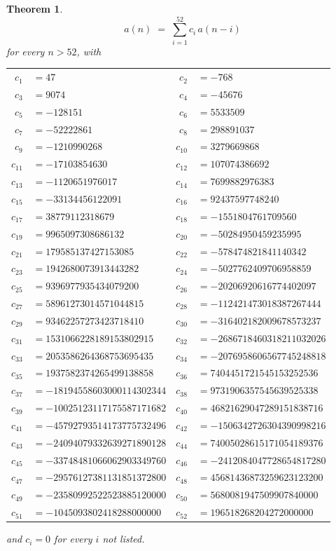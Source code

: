 \documentclass[11pt,a4paper]{article}
\theoremstyle{plain}
\newtheorem{theorem}{Theorem}
\theoremstyle{definition}
\begin{document}
\begin{theorem}
\[
a(n)\;=\;\sum_{i=1}^{52}c_i\,a(n-i)
\]
for every $n>52$, with
\begin{center}\footnotesize
\begin{tabular}{r@{\,}l@{\qquad}r@{\,}l}
$c_{1}$ & $=47$ & $c_{2}$ & $=-768$ \\
$c_{3}$ & $=9074$ & $c_{4}$ & $=-45676$ \\
$c_{5}$ & $=-128151$ & $c_{6}$ & $=5533509$ \\
$c_{7}$ & $=-52222861$ & $c_{8}$ & $=298891037$ \\
$c_{9}$ & $=-1210990268$ & $c_{10}$ & $=3279669868$ \\
$c_{11}$ & $=-17103854630$ & $c_{12}$ & $=107074386692$ \\
$c_{13}$ & $=-1120651976017$ & $c_{14}$ & $=7699882976383$ \\
$c_{15}$ & $=-33134456122091$ & $c_{16}$ & $=92437597748240$ \\
$c_{17}$ & $=38779112318679$ & $c_{18}$ & $=-1551804761709560$ \\
$c_{19}$ & $=9965097308686132$ & $c_{20}$ & $=-50284950459235995$ \\
$c_{21}$ & $=179585137427153085$ & $c_{22}$ & $=-578474821841140342$ \\
$c_{23}$ & $=1942680073913443282$ & $c_{24}$ & $=-5027762409706958859$ \\
$c_{25}$ & $=9396977935434079200$ & $c_{26}$ & $=-20206920616774402097$ \\
$c_{27}$ & $=58961273014571044815$ & $c_{28}$ & $=-112421473018387267444$ \\
$c_{29}$ & $=93462257273423718410$ & $c_{30}$ & $=-316402182009678573237$ \\
$c_{31}$ & $=1531066228189153802915$ & $c_{32}$ & $=-2686718460318211032026$ \\
$c_{33}$ & $=2053586264368753695435$ & $c_{34}$ & $=-2076958606567745248818$ \\
$c_{35}$ & $=1937582374265499138858$ & $c_{36}$ & $=7404451721545153252536$ \\
$c_{37}$ & $=-18194558603000114302344$ & $c_{38}$ & $=9731906357545639525338$ \\
$c_{39}$ & $=-10025123117175587171682$ & $c_{40}$ & $=46821629047289151838716$ \\
$c_{41}$ & $=-45792793514173775732496$ & $c_{42}$ & $=-1506342726304390998216$ \\
$c_{43}$ & $=-24094079332639271890128$ & $c_{44}$ & $=74005028615171054189376$ \\
$c_{45}$ & $=-33748481066062903349760$ & $c_{46}$ & $=-2412084047728654817280$ \\
$c_{47}$ & $=-29576127381131851372800$ & $c_{48}$ & $=45681436873259623123200$ \\
$c_{49}$ & $=-23580992522523885120000$ & $c_{50}$ & $=5680081947509907840000$ \\
$c_{51}$ & $=-1045093802418288000000$ & $c_{52}$ & $=196518268204272000000$ \\
\end{tabular}
\end{center}
and $c_i=0$ for every $i$ not listed.
\end{theorem}
\end{document}
